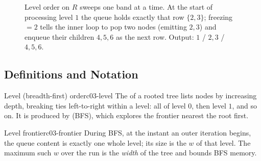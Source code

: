 \begin{figure}[H]
\centering
{}
\caption{Level order on $R$ sweeps one band at a time. At the start of processing level
$1$ the queue holds exactly that row $\{2,3\}$; freezing $=2$ tells the inner loop
to pop two nodes (emitting $2,3$) and enqueue their children $4,5,6$ as the next row.
Output: $1$ / $2,3$ / $4,5,6$.}\label{fig:c03-bfs}
\end{figure}

\subsection{Definitions and Notation}

\begin{definition}{Level (breadth-first) order}{c03-level}
The  of a rooted tree lists nodes by increasing depth, breaking ties
left-to-right within a level: all of level $0$, then level $1$, and so on. It is produced
by  (BFS), which explores the frontier nearest the root first.
\end{definition}

\begin{definition}{Level frontier}{c03-frontier}
During BFS, at the instant an outer iteration begins, the queue content is exactly one
whole level; its size is the  $w$ of that level. The maximum such $w$
over the run is the \emph{width} of the tree and bounds BFS memory.
\end{definition}

